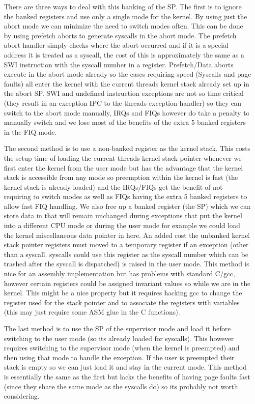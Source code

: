 \documentclass[a4paper,10pt,twoside]{article}
\begin{document}
There are three ways to deal with this banking of the SP. The first is to
ignore the banked registers and use only a single mode for the kernel. By
using just the abort mode we can minimize the need to switch modes often.
This can be done by using prefetch aborts to generate syscalls in the abort
mode. The prefetch abort handler simply checks where the abort occurred and
if it is a special address it is treated as a syscall, the cost of this is
approximately the same as a SWI instruction with the syscall number in a
register. Prefetch/Data aborts execute in the abort mode already so the
cases requiring speed (Syscalls and page faults) all enter the kernel with
the current threads kernel stack already set up in the abort SP. SWI and
undefined instruction exceptions are not so time critical (they result in an
exception IPC to the threads exception handler) so they can switch to the
abort mode manually, IRQs and FIQs however do take a penalty to manually
switch and we lose most of the benefits of the extra 5 banked registers in
the FIQ mode.

The second method is to use a non-banked register as the kernel stack.
This costs the setup time of loading the current threads kernel stack pointer
whenever we first enter the kernel from the user mode but has the advantage
that the kernel stack is accessible from any mode so preemption within the
kernel is fast (the kernel stack is already loaded) and the IRQs/FIQs get the
benefit of not requiring to switch modes as well as FIQs having the extra
5 banked registers to allow fast FIQ handling. We also free up a banked
register (the SP) which we can store data in that will remain unchanged
during exceptions that put the kernel into a different CPU mode or during
the user mode for example we could load the kernel miscellaneous data pointer
in here. An added cost the unbanked kernel stack pointer registers must moved
to a temporary register if an exception (other than a syscall. syscalls could
use this register as the syscall number which can be trashed after the syscall
is dispatched) is raised in the user mode. This method is nice for an assembly
implementation but has problems with standard C/gcc, however certain registers
could be assigned invariant values so while we are in the kernel. This might
be a nice property but it requires hacking gcc to change the register used for
the stack pointer and to associate the registers with variables (this may just
require some ASM glue in the C functions).

The last method is to use the SP of the supervisor mode and load it before
switching to the user mode (so its already loaded for syscalls). This however
requires switching to the supervisor mode (when the kernel is preempted) and
then using that mode to handle the exception. If the user is preempted their
stack is empty so we can just load it and stay in the current mode. This
method is essentially the same as the first but lacks the benefits of having
page faults fast (since they share the same mode as the syscalls do) so its
probably not worth considering.
\end{document}
